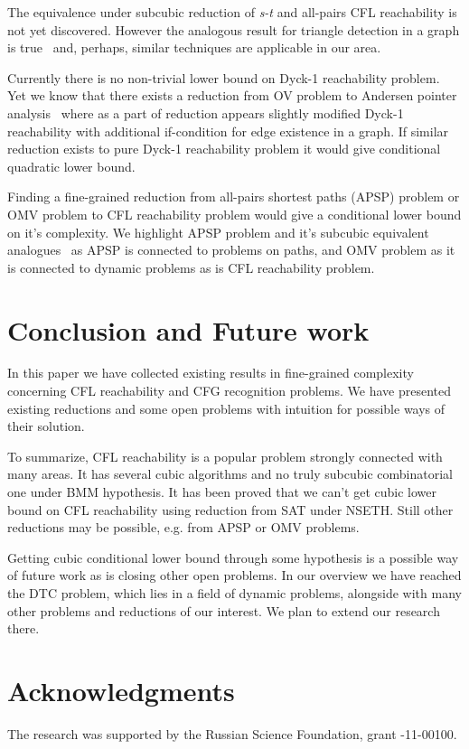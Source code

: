 \documentclass[acmsmall,nonacm]{acmart}
\begin{document}
	The equivalence under subcubic reduction of \emph{s-t} and 
	all-pairs CFL reachability is not yet discovered. However the analogous result for triangle detection in a graph is true~\cite{10.1145/3186893} and, perhaps, similar techniques are applicable in our area. 
	
	Currently there is no non-trivial lower bound on Dyck-1 reachability problem. 
	Yet we know that there exists a reduction from OV problem to Andersen pointer analysis~\cite{10.1145/3434315} where as a part of reduction appears slightly modified Dyck-1 reachability with additional if-condition for edge existence in a graph. If similar reduction exists to pure Dyck-1 reachability problem it would give conditional quadratic lower bound. 
	
	Finding a fine-grained reduction from all-pairs shortest paths (APSP) problem or OMV problem to CFL reachability problem would give a conditional lower bound on it's complexity. We highlight APSP problem and it's subcubic equivalent analogues~\cite{10.1145/3186893} as APSP is connected to problems on paths, and OMV problem as it is connected to dynamic problems as is CFL reachability problem. 
	
	\section{Conclusion and Future work}
	
	In this paper we have collected existing results in fine-grained complexity concerning CFL reachability and CFG recognition problems. We have presented existing reductions and some open problems with intuition for possible ways of their solution. 
	
	To summarize, CFL reachability is a popular problem strongly connected with many areas. It has several cubic algorithms and no truly subcubic combinatorial one under BMM hypothesis. It has been proved that we can't get cubic lower bound on CFL reachability using reduction from SAT under NSETH. Still other reductions may be possible, e.g. from APSP or OMV problems. 
	
	Getting cubic conditional lower bound through some hypothesis is a possible way of future work as is closing other open problems. In our overview we have reached the DTC problem, which lies in a field of dynamic problems, alongside with many other problems and reductions of our interest. We plan to extend our research there. 
	
	\section{Acknowledgments}
	
	The research was supported by the Russian Science Foundation, grant -11-00100.
	
	
	
	
	
\end{document}
